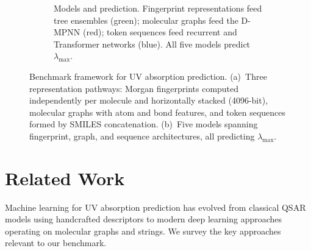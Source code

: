 \documentclass[journal=jcisd8,manuscript=article]{achemso}
\begin{document}
\begin{figure}[!ht]
\begin{subfigure}[b]{\textwidth}
 \caption{Models and prediction. Fingerprint representations feed tree ensembles (green); molecular graphs feed the D-MPNN (red); token sequences feed recurrent and Transformer networks (blue). All five models predict $\lambda_{\max}$.}
 \label{fig:framework_models}
 \end{subfigure}

 \caption{Benchmark framework for UV absorption prediction. (a)~Three representation pathways: Morgan fingerprints computed independently per molecule and horizontally stacked (4096-bit), molecular graphs with atom and bond features, and token sequences formed by SMILES concatenation. (b)~Five models spanning fingerprint, graph, and sequence architectures, all predicting $\lambda_{\max}$.}
 \label{fig:benchmark_framework}
\end{figure}

\FloatBarrier
\section{Related Work}
\label{sec:related_work}

Machine learning for UV absorption prediction has evolved from classical QSAR models using handcrafted descriptors to modern deep learning approaches operating on molecular graphs and strings.
We survey the key approaches relevant to our benchmark.
\end{document}
